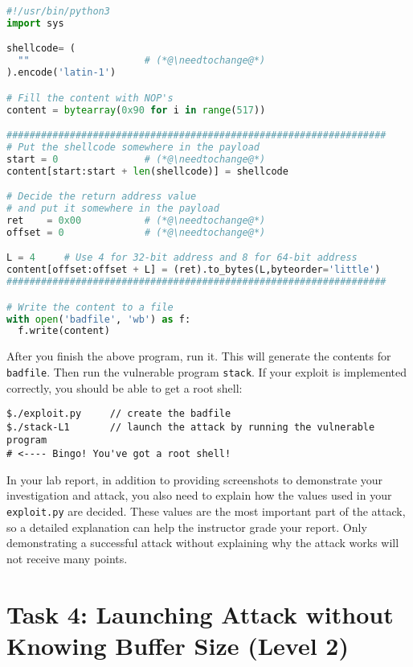 \begin{lstlisting}[language=python, caption={\texttt{exploit.py}}]
#!/usr/bin/python3
import sys

shellcode= (
  ""                    # (*@\needtochange@*)
).encode('latin-1')

# Fill the content with NOP's
content = bytearray(0x90 for i in range(517))

##################################################################
# Put the shellcode somewhere in the payload
start = 0               # (*@\needtochange@*)
content[start:start + len(shellcode)] = shellcode

# Decide the return address value
# and put it somewhere in the payload
ret    = 0x00           # (*@\needtochange@*)
offset = 0              # (*@\needtochange@*)

L = 4     # Use 4 for 32-bit address and 8 for 64-bit address
content[offset:offset + L] = (ret).to_bytes(L,byteorder='little')
##################################################################

# Write the content to a file
with open('badfile', 'wb') as f:
  f.write(content)
\end{lstlisting}


After you finish the above program, run it. This will generate
the contents for \texttt{badfile}. Then run the vulnerable 
program {\tt stack}. If your exploit is implemented correctly, you should 
be able to get a root shell:  


\begin{lstlisting}
$./exploit.py     // create the badfile
$./stack-L1       // launch the attack by running the vulnerable program
# <---- Bingo! You've got a root shell! 
\end{lstlisting}

In your lab report, in addition to providing screenshots to demonstrate
your investigation and attack, 
you also need to explain how the values used in your 
\texttt{exploit.py} are decided. These values are the most 
important part of the attack, so a detailed explanation can help
the instructor grade your report. Only demonstrating a successful
attack without explaining why the attack works will not 
receive many points. 



\section{Task 4: Launching Attack without Knowing Buffer Size (Level 2)}

